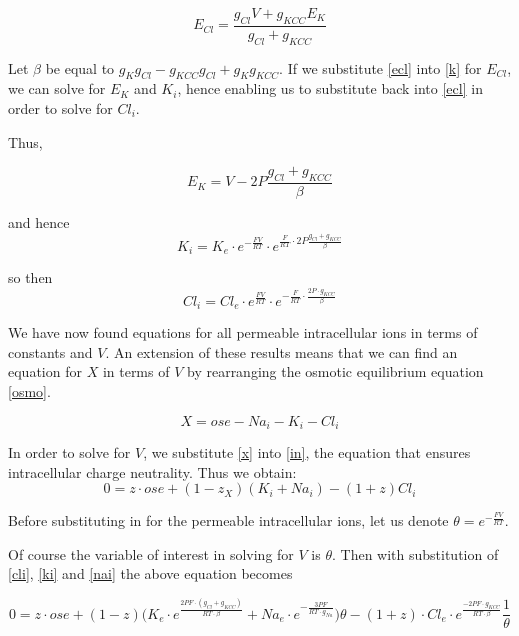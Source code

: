 \documentclass[a4paper,11pt]{article}
\begin{document}
\begin{equation} \label{ecl}
E_{Cl} = \frac{g_{Cl}V+g_{KCC}E_K}{g_{Cl}+g_{KCC}}
\end{equation}

Let $\beta$ be equal to $g_Kg_{Cl}-g_{KCC}g_{Cl}+g_Kg_{KCC}$. If we substitute \eqref{ecl} into \eqref{k} for $E_{Cl}$, we can solve for $E_K$ and $K_i$, hence enabling us to substitute back into \eqref{ecl} in order to solve for $Cl_i$.

Thus,

\begin{equation*}
E_K = V-2P\frac{g_{Cl}+g_{KCC}}{\beta}
\end{equation*}

and hence
\begin{equation} \label{ki}
K_i = K_e \cdot e^{-\frac{FV}{RT}} \cdot e^{\frac{F}{RT} \cdot 2P\frac{g_{Cl}+g_{KCC}}{\beta}}
\end{equation}

so then
\begin{equation} \label{cli}
Cl_i = Cl_e \cdot e^{\frac{FV}{RT}} \cdot e^{-\frac{F}{RT} \cdot \frac{2P \cdot g_{KCC}}{\beta}}
\end{equation}

We have now found equations for all permeable intracellular ions in terms of constants and $V$. An extension of these results means that we can find an equation for $X$ in terms of $V$ by rearranging the osmotic equilibrium equation \eqref{osmo}.

\begin{equation} \label{x}
X=ose-Na_i-K_i-Cl_i
\end{equation}

In order to solve for $V$, we substitute \eqref{x} into \eqref{in}, the equation that ensures intracellular charge neutrality. Thus we obtain:
\begin{equation*}
0=z\cdot ose + (1-z_X)(K_i+Na_i)-(1+z)Cl_i
\end{equation*}

Before substituting in for the permeable intracellular ions, let us denote $\theta = e^{-\frac{FV}{RT}}$.

Of course the variable of interest in solving for $V$ is $\theta$. Then with substitution of \eqref{cli}, \eqref{ki} and \eqref{nai} the above equation becomes

\begin{equation*}
0=z \cdot ose + (1-z)\Big(K_e \cdot e^{\frac{2 P F \cdot (g_{Cl}+ g_{KCC})}{RT \cdot \beta}} +Na_e \cdot e^{-\frac{3PF}{RT\cdot g_{Na}}} \Big)\theta - (1+z)\cdot Cl_e \cdot e^{\frac{-2PF\cdot g_{KCC}}{RT \cdot \beta}}\frac{1}{\theta} 
\end{equation*}
\end{document}
